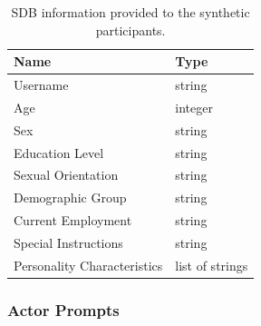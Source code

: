 \begin{table}[ht]
\centering
\begin{tabular}{|l|l|}
    \toprule
    Name & Type \\
    \midrule
    Username & string \\
    Age & integer \\
    Sex & string \\
    Education Level & string \\
    Sexual Orientation & string \\
    Demographic Group & string \\
    Current Employment & string \\
    Special Instructions & string \\
    Personality Characteristics & list of strings \\
    \bottomrule
\end{tabular}
\caption{\ac{SDB} information provided to the synthetic participants.}
\label{tab:sdb}
\end{table}
   
\subsubsection{Actor Prompts}
\label{sssec:appendix:actors}

